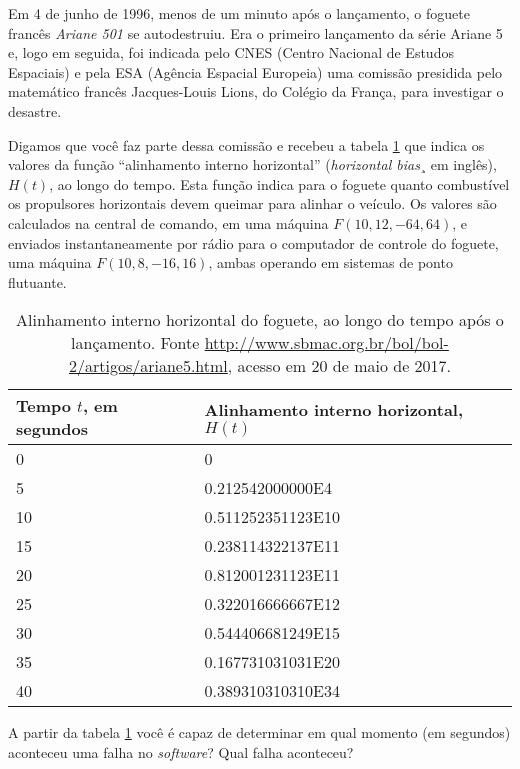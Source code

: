 \begin{ex}
Em 4 de junho de 1996, menos de um minuto após o lançamento, o foguete francês \emph{Ariane 501} se autodestruiu. Era o primeiro lançamento da série Ariane 5 e, logo em seguida, foi indicada pelo CNES (Centro Nacional de Estudos Espaciais) e pela ESA (Agência Espacial Europeia) uma comissão presidida pelo matemático francês Jacques-Louis Lions, do Colégio da França, para investigar o desastre.


Digamos que você faz parte dessa comissão e recebeu a tabela \ref{foguete} que indica os valores da função “alinhamento interno horizontal” (\emph{horizontal bias}¸ em inglês), $H(t)$, ao longo do tempo. Esta função indica para o foguete quanto combustível os propulsores horizontais devem queimar para alinhar o veículo. Os valores são calculados na central de comando, em uma máquina $F(10,12,-64,64)$, e enviados instantaneamente por rádio para o computador de controle do foguete, uma máquina $F(10,8,-16,16)$, ambas operando em sistemas de ponto flutuante.


\begin{table}[h!b]
\centering
\caption{Alinhamento interno horizontal do foguete, ao longo do tempo após o lançamento. Fonte \url{http://www.sbmac.org.br/bol/bol-2/artigos/ariane5.html}, acesso em 20 de maio de 2017.}
\label{foguete}
\begin{tabular}{@{}ll@{}}
\toprule
Tempo $t$, em segundos & Alinhamento interno horizontal, $H(t)$ \\ \midrule
0                      & 0                                      \\
5                      & 0.212542000000E4                             \\
10                     & 0.511252351123E10                      \\
15                     & 0.238114322137E11                      \\
20                     & 0.812001231123E11                      \\
25                     & 0.322016666667E12                      \\
30                     & 0.544406681249E15                      \\
35                     & 0.167731031031E20                      \\
40                     & 0.389310310310E34                      \\ \bottomrule
\end{tabular}
\end{table}


A partir da tabela \ref{foguete} você é capaz de determinar em qual momento (em segundos) aconteceu uma falha no \emph{software}? Qual falha aconteceu?

\end{ex}

